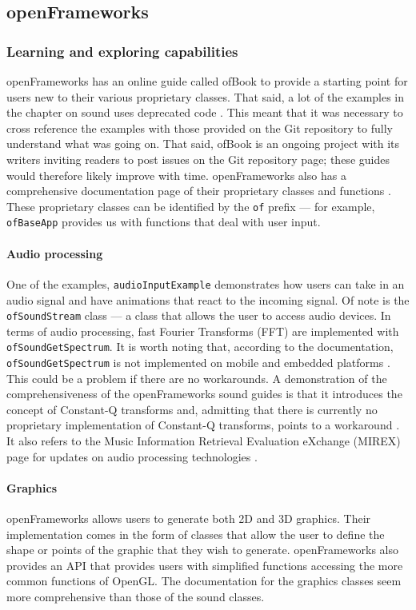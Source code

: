 \documentclass[../../initial_thesis.tex]{subfiles}
\begin{document}
\subsection{openFrameworks}\label{sec:openframeworks}

\subsubsection{Learning and exploring capabilities}
openFrameworks has an online guide called ofBook to provide a starting point for users new to their various proprietary classes. That said, a lot of the examples in the chapter on sound uses deprecated code \cite{Carlucci}. This meant that it was necessary to cross reference the examples with those provided on the Git repository to fully understand what was going on. That said, ofBook is an ongoing project with its writers inviting readers to post issues on the Git repository page; these guides would therefore likely improve with time. openFrameworks also has a comprehensive documentation page of their proprietary classes and functions \cite{openFrameworks}. These proprietary classes can be identified by the \verb|of| prefix --- for example, \verb|ofBaseApp| provides us with functions that deal with user input.

\paragraph{Audio processing}
One of the examples, \verb|audioInputExample| demonstrates how users can take in an audio signal and have animations that react to the incoming signal. Of note is the \verb|ofSoundStream| class --- a class that allows the user to access audio devices. In terms of audio processing, fast Fourier Transforms (FFT) are implemented with \verb|ofSoundGetSpectrum|. It is worth noting that, according to the documentation, \verb|ofSoundGetSpectrum| is not implemented on mobile and embedded platforms \cite{OFsoundstreamFFT}. This could be a problem if there are no workarounds. A demonstration of the comprehensiveness of the openFrameworks sound guides is that it introduces the concept of Constant-Q transforms and, admitting that there is currently no proprietary implementation of Constant-Q transforms, points to a workaround \cite{Klapuri}. It also refers to the Music Information Retrieval Evaluation eXchange (MIREX) page for updates on audio processing technologies \cite{mirexWiki}.

\paragraph{Graphics}
openFrameworks allows users to generate both 2D and 3D graphics. Their implementation comes in the form of classes that allow the user to define the shape or points of the graphic that they wish to generate. openFrameworks also provides an API that provides users with simplified functions accessing the more common functions of OpenGL. The documentation for the graphics classes seem more comprehensive than those of the sound classes.
\end{document}
